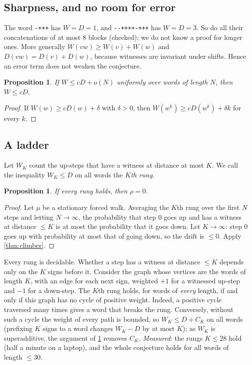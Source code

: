 \documentclass[11pt]{amsart}
\newtheorem{proposition}[theorem]{Proposition}
\theoremstyle{definition}
\begin{document}
\subsection{Sharpness, and no room for error}
The word \texttt{-+++} has $W=D=1$, and \texttt{-{}-++++-+++} has $W=D=3$. So do all their concatenations of at most $8$ blocks
(checked); we do not know a proof for longer ones. More generally
$W(vw)\ge W(v)+W(w)$ and $D(vw)=D(v)+D(w)$, because witnesses are invariant under shifts. Hence an error term does not
weaken the conjecture.

\begin{proposition}\label{prop:slack}
If $W\le cD+o(N)$ uniformly over words of length $N$, then $W\le cD$.
\end{proposition}

\begin{proof}
If $W(w)\ge cD(w)+\delta$ with $\delta>0$, then $W(w^k)\ge cD(w^k)+\delta k$ for every $k$.
\end{proof}

\subsection{A ladder}
Let $W_K$ count the up-steps that have a witness at distance at most $K$. We call the inequality $W_K\le D$ on all words the \emph{$K$th rung}.

\begin{proposition}\label{prop:ladder}
If every rung holds, then $\rho=0$.
\end{proposition}

\begin{proof}
Let $\mu$ be a stationary forced walk. Averaging the $K$th rung over the first $N$ steps and letting $N\to\infty$, the
probability that step $0$ goes up and has a witness at distance $\le K$ is at most the probability that it goes down. Let $K\to\infty$: step $0$ goes up with
probability at most that of going down, so the drift is $\le0$. Apply \cref{thm:climber}.
\end{proof}

Every rung is decidable. Whether a step has a witness at distance $\le K$ depends only on the $K$ signs before it. Consider the graph whose vertices are the words of length $K$, with an edge for each next sign, weighted $+1$ for a witnessed
up-step and $-1$ for a down-step. The $K$th rung holds, for words of \emph{every} length, if and only if this graph has no cycle of
positive weight. Indeed, a positive cycle traversed many times gives a word that breaks the rung. Conversely, without such a cycle
the weight of every path is bounded, so $W_K\le D+C_K$ on all words (prefixing $K$ signs to a word changes $W_K-D$ by at most $K$);
as $W_K$ is superadditive, the argument of \cref{prop:slack} removes $C_K$. \emph{Measured}: the rungs
$K\le28$ hold (half a minute on a laptop), and the whole conjecture holds for all words of length $\le30$.
\end{document}
